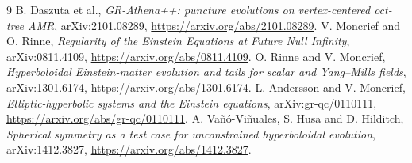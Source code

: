 \documentclass[11pt]{article}
\begin{document}
\begin{thebibliography}{9}
 B. Daszuta et al., \emph{GR-Athena++: puncture evolutions on
vertex-centered oct-tree AMR}, arXiv:2101.08289,
\url{https://arxiv.org/abs/2101.08289}.
 V. Moncrief and O. Rinne, \emph{Regularity of the Einstein
Equations at Future Null Infinity}, arXiv:0811.4109,
\url{https://arxiv.org/abs/0811.4109}.
 O. Rinne and V. Moncrief, \emph{Hyperboloidal Einstein-matter
evolution and tails for scalar and Yang--Mills fields}, arXiv:1301.6174,
\url{https://arxiv.org/abs/1301.6174}.
 L. Andersson and V. Moncrief, \emph{Elliptic-hyperbolic
systems and the Einstein equations}, arXiv:gr-qc/0110111,
\url{https://arxiv.org/abs/gr-qc/0110111}.
 A. Va\~n\'o-Vi\~nuales, S. Husa and D. Hilditch,
\emph{Spherical symmetry as a test case for unconstrained hyperboloidal evolution},
arXiv:1412.3827, \url{https://arxiv.org/abs/1412.3827}.
\end{thebibliography}
\end{document}
